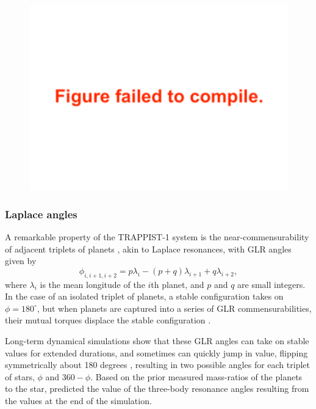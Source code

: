 \documentclass[twocolumn]{aastex63}
\begin{document}
\begin{figure}
    \centering
    \includegraphics[width=\hsize]{figures/delta_omega_bc.pdf}
    \label{fig:delta_omega}
\end{figure}

\subsubsection{Laplace angles}

A remarkable property of the TRAPPIST-1 system is the near-commensurability
of adjacent triplets of planets \citep{Luger2017b}, akin to Laplace resonances, with
GLR angles given by
\begin{equation}
    \phi_{i,i+1,i+2} = p \lambda_i - (p+q) \lambda_{i+1} + q \lambda_{i+2},
\end{equation}
where $\lambda_i$ is the mean longitude of the $i$th planet, and $p$ and
$q$ are small integers.  In
the case of an isolated triplet of planets, a stable configuration takes
on $\phi = 180^\circ$, but when planets are captured into a series of GLR
commensurabilities, their mutual torques displace the stable configuration
\citep{Delisle2017}.

Long-term
dynamical simulations show that these GLR angles can take on stable values
for extended durations, and sometimes can quickly jump in value, flipping symmetrically about
180 degrees \citep{Mah2018},
resulting in two possible angles for each triplet of stars, $\phi$ and $360-\phi$.
Based on the prior measured mass-ratios of the planets to the star, \citet{Mah2018}
predicted the value of the three-body resonance angles resulting from the values at the
end of the simulation.
\end{document}
